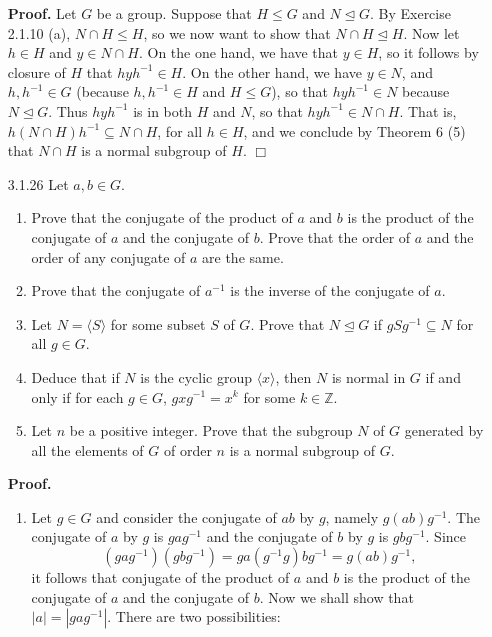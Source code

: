 \documentclass[9pt]{article}
\newcommand{\qed}{\hfill \ensuremath{\Box}}
\newcommand{\cyc}[1]{\langle #1 \rangle}
\newcommand{\Z}{\mathbb{Z}}
\begin{document}
\begin{enumerate}
      \textbf{Proof.} Let $G$ be a group. Suppose that $H \le G$ and
      $N \trianglelefteq G$. By Exercise 2.1.10 (a), $N \cap H \le H$, so we
      now want to show that $N \cap H \trianglelefteq H$. Now let $h \in H$
      and $y \in N \cap H$. On the one hand, we have that $y \in H$, so it
      follows by closure of $H$ that $hyh^{-1} \in H$. On the other hand, we
      have $y \in N$, and $h, h^{-1} \in G$
      (because $h, h^{-1} \in H$ and $H \le G$), so that $hyh^{-1} \in N$
      because $N \trianglelefteq G$. Thus $hyh^{-1}$ is in both $H$ and $N$, so
      that $hyh^{-1} \in N \cap H$. That is,
      $h(N \cap H)h^{-1} \subseteq N \cap H$, for all $h \in H$, and we conclude
      by Theorem 6 (5)  that $N \cap H$ is a normal subgroup of $H$. \qed
   \item[3.1.26]  Let $a, b \in G$.
                  \begin{enumerate}
                     \item Prove that the conjugate of the product of $a$ and
                           $b$ is the product of the conjugate of $a$ and the
                           conjugate of $b$. Prove that the order of $a$ and the
                           order of any conjugate of $a$ are the same.
                     \item Prove that the conjugate of $a^{-1}$ is the inverse
                           of the conjugate of $a$.
                     \item Let $N = \cyc{S}$ for some subset $S$ of $G$. Prove
                           that $N \trianglelefteq G$ if $gSg^{-1} \subseteq N$
                           for all $g \in G$.
                     \item Deduce that if $N$ is the cyclic group $\cyc{x}$,
                           then $N$ is normal in $G$ if and only if for each
                           $g \in G$, $gxg^{-1} = x^k$ for some $k \in \Z$.
                     \item Let $n$ be a positive integer. Prove that the
                           subgroup $N$ of $G$ generated by all the elements of
                           $G$ of order $n$ is a normal subgroup of $G$.
                  \end{enumerate}
     
   \textbf{Proof.}
   
   \begin{enumerate}
      \item Let $g \in G$ and consider the conjugate of $ab$ by $g$, namely
            $g(ab)g^{-1}$. The conjugate of $a$ by $g$ is $gag^{-1}$ and the
            conjugate of $b$ by $g$ is $gbg^{-1}$. Since
            $$(gag^{-1})(gbg^{-1}) = ga(g^{-1}g)bg^{-1} = g(ab)g^{-1},$$
            it follows that conjugate of the product of $a$ and $b$ is the
            product of the conjugate of $a$ and the conjugate of $b$. Now we
            shall show that $|a| = |gag^{-1}|$. There are two possibilities:


\end{enumerate}
\end{enumerate}
\end{document}
